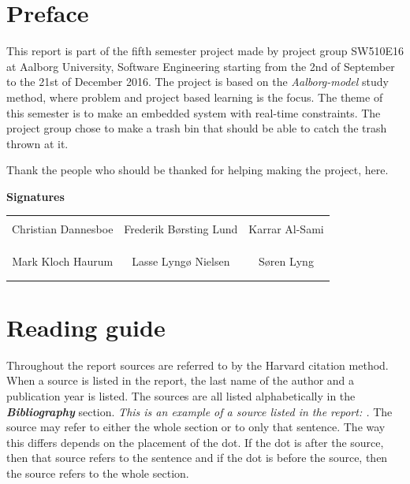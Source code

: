 \chapter*{Preface}
This report is part of the fifth semester project made by project group SW510E16 at Aalborg University, Software Engineering starting from the 2nd of September to the 21st of December 2016. \newline
The project is based on the \textit{Aalborg-model} study method, where problem and project based learning is the focus. The theme of this semester is to make an embedded system with real-time constraints. The project group chose to make a trash bin that should be able to catch the trash thrown at it. \newline

Thank the people who should be thanked for helping making the project, here. 
\newline
\newline
\newline
\newline

{\Huge\textbf{Signatures}}
\newline
\newline

\begin{table}[H]
	\centering
		\begin{tabular}{c c c}
			\underline{\phantom{mmmmmmmmmmmmmm}} & \underline{\phantom{mmmmmmmmmmmmmm}} & \underline{\phantom{mmmmmmmmmmmmmm}} \\
			Christian Dannesboe			& Frederik Børsting Lund 		& Karrar Al-Sami 			\\
			&&\\
			&&\\
			\underline{\phantom{mmmmmmmmmmmmmm}} & \underline{\phantom{mmmmmmmmmmmmmm}} & \underline{\phantom{mmmmmmmmmmmmmm}} \\
			Mark Kloch Haurum			& Lasse Lyngø Nielsen 		& Søren Lyng 				\\
			&&\\
			&&\\
		 																		
		\end{tabular}
\end{table}

\chapter*{Reading guide}
Throughout the report sources are referred to by the Harvard citation method. When a source is listed in the report, the last name of the author and a publication year is listed. The sources are all listed alphabetically in  the \textit{\textbf{Bibliography}} section. \newline
\textit{This is an example of a source listed in the report: \textbf{\citep{safe}}.} \newline
The source may refer to either the whole section or to only that sentence. The way this differs depends on the placement of the dot. If the dot is after the source, then that source refers to the sentence and if the dot is before the source, then the source refers to the whole section. 


